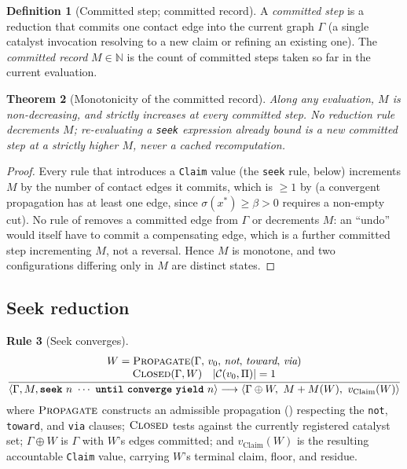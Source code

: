 \documentclass[11pt,twocolumn,a4paper]{article}
\theoremstyle{thmstyle}
\newtheorem{theorem}{Theorem}[section]
\theoremstyle{definition}
\newtheorem{definition}[theorem]{Definition}
\newtheorem{rulename}[theorem]{Rule}
\theoremstyle{remark}
\newcommand{\N}{\mathbb{N}}
\newcommand{\Gph}{\Gamma}
\newcommand{\flo}{\beta}
\newcommand{\Walk}{W}
\newcommand{\rec}{M}
\newcommand{\str}{\sigma}
\newcommand{\Proc}{\Pi}
\newcommand{\Cell}{\mathcal{C}}
\newcommand{\stepto}{\longrightarrow}
\newcommand{\abs}[1]{\lvert#1\rvert}
\newcommand{\tm}[1]{\textbf{\texttt{#1}}}
\begin{document}
\begin{definition}[Committed step; committed record]
\label{def:committed}
A \emph{committed step} is a reduction that commits one contact edge into
the current graph $\Gph$ (a single catalyst invocation resolving to a new
claim or refining an existing one). The \emph{committed record}
$\rec\in\N$ is the count of committed steps taken so far in the current
evaluation.
\end{definition}

\begin{theorem}[Monotonicity of the committed record]
\label{thm:monotone-count}
Along any evaluation, $\rec$ is non-decreasing, and strictly increases at
every committed step. No reduction rule decrements $\rec$; re-evaluating a
\texttt{seek} expression already bound is a new committed step at a
strictly higher $\rec$, never a cached recomputation.
\end{theorem}

\begin{proof}
Every rule that introduces a \texttt{Claim} value (the \texttt{seek}
rule,  below) increments $\rec$ by the number of
contact edges it commits, which is $\ge1$ by  (a
convergent propagation has at least one edge, since $\str(x^\ast)\ge\flo>0$
requires a non-empty cut). No rule of  removes a
committed edge from $\Gph$ or decrements $\rec$: an ``undo'' would itself
have to commit a compensating edge, which is a further committed step
incrementing $\rec$, not a reversal. Hence $\rec$ is monotone, and two
configurations differing only in $\rec$ are distinct states.
\end{proof}

\subsection{Seek reduction}

\begin{rulename}[Seek converges]
\label{rule:seek-eval}
\[
\frac{
\begin{array}{c}
\Walk = \textsc{Propagate}(\Gph,\,v_0,\,\textit{not},\,\textit{toward},\,
\textit{via})\\
\textsc{Closed}(\Gph,\Walk) \quad
\abs{\Cell(v_0,\Proc)}=1
\end{array}
}
{\langle\Gph,\rec,\tm{seek}\ n\ \cdots\ \tm{until}\ \tm{converge}\
      \tm{yield}\ n\rangle
\stepto
\langle\Gph\oplus\Walk,\ \rec+\rec(\Walk),\ v_{\mathrm{Claim}}(\Walk)\rangle}
\]
where $\textsc{Propagate}$ constructs an admissible propagation
() respecting the \texttt{not}, \texttt{toward}, and
\texttt{via} clauses; $\textsc{Closed}$ tests \Cref{def:closure} against
the currently registered catalyst set; $\Gph\oplus\Walk$ is $\Gph$ with
$\Walk$'s edges committed; and $v_{\mathrm{Claim}}(\Walk)$ is the resulting
accountable \texttt{Claim} value, carrying $\Walk$'s terminal claim,
floor, and residue.
\end{rulename}
\end{document}
